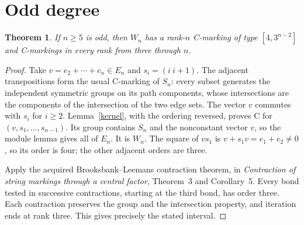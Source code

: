 \documentclass[11pt,a4paper]{article}
\newtheorem{theorem}[lemma]{Theorem}
\begin{document}
\section{Odd degree}
\begin{theorem}\label{odd}
If $n\ge5$ is odd, then $W_n$ has a rank-$n$ C-marking of type
$[4,3^{n-2}]$ and C-markings in every rank from three through $n$.
\end{theorem}
\begin{proof}
Take $v=e_2+\cdots+e_n\in E_n$ and $s_i=(i\ i+1)$.
The adjacent transpositions form the usual C-marking of $S_n$:
every subset generates the independent symmetric groups on its path
components, whose intersections are the components of the intersection
of the two edge sets. The vector $v$ commutes with $s_i$ for $i\ge2$.
Lemma~\ref{kernel}, with the ordering reversed, proves C for
$(v,s_1,\ldots,s_{n-1})$.
Its group contains $S_n$ and the nonconstant vector $v$, so the
module lemma gives all of $E_n$. It is $W_n$.
The square of $v s_1$ is $v+s_1v=e_1+e_2\ne0$, so its order is
four; the other adjacent orders are three.

Apply the acquired Brooksbank--Leemans contraction theorem, in
\emph{Contraction of string markings through a central factor},
Theorem~3 and Corollary~5. Every bond tested in successive contractions,
starting at the third bond, has order three. Each contraction preserves
the group and the intersection property, and iteration ends at rank
three. This gives precisely the stated interval.
\end{proof}
\end{document}
